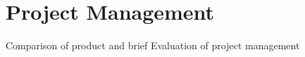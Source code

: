 \chapter{Project Management}
\label{chapter:mang}

Comparison of product and brief
Evaluation of project management